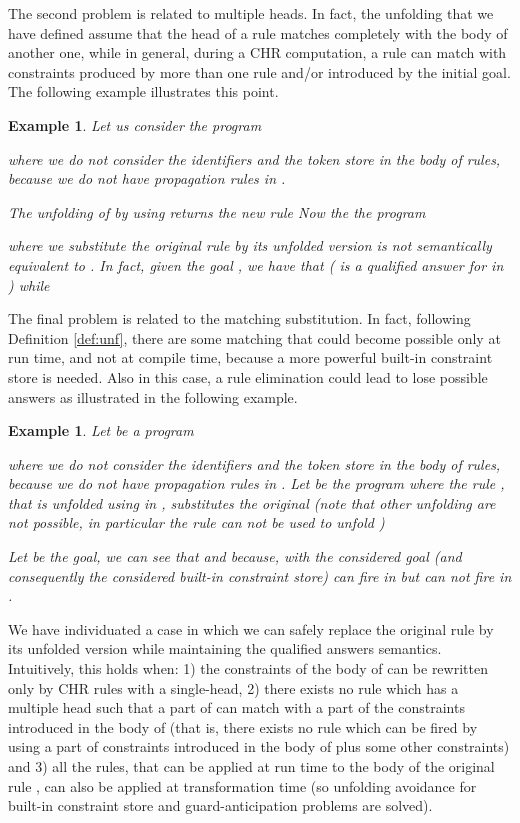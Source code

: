 \documentclass[final]{acmtrans2e}
\newtheorem{exa}[theorem]{Example}
\newenvironment{example}{\begin{exa}}{\end{exa}}
\begin{document}
The second problem is related to multiple heads. In fact, the
unfolding that we have defined  assume that the head of a rule
matches completely with the body of another one, while in general,
during a CHR computation, a rule can match with constraints
produced by more than one rule and/or  introduced by the initial
goal. The following example illustrates this point.

\begin{example}\label{ex:unicatesta}
Let us consider the program

where we do not consider the identifiers and the token store in
the body of rules, because we do not have propagation rules in
.

The unfolding  of  by using   returns the new
rule
 Now the
the program

where we substitute the original rule by its  unfolded version is
not semantically equivalent to . In fact, given the goal , we have that  
( is a qualified answer for  in ) while 
\end{example}

The final problem is related to the matching substitution. In fact,
following Definition \ref{def:unf}, there are some matching that could become
possible only at run time, and not at compile time, because a more powerful
built-in constraint store is needed. Also in this case, a rule elimination could lead to lose
possible answers as illustrated in the following example.

\begin{example}\label{ex:matching}
Let  be a program

where we do not consider the identifiers and the token store in the
body of rules, because we do not have propagation rules in .
Let  be the program where the rule , that is unfolded using  in ,
substitutes the original  (note that other unfolding are not possible, in
particular the rule  can not be used to unfold )

Let be  the goal, we can see that
 and   because,
with the considered goal (and consequently
the considered built-in constraint store)  can fire in  but can not fire in
.
\end{example}

We have individuated a case in which we can safely replace the
original rule  by its unfolded version while maintaining the
qualified answers semantics. Intuitively, this holds when: 1)  the
constraints of the body of   can
 be rewritten only by CHR rules with a single-head, 2) there exists
no rule  which has a multiple head  such that a part of 
can match with a part of the constraints introduced in the body of
 (that is, there exists no rule  which can be fired by using
a part of constraints introduced in the body of  plus some
other constraints) and 3) all the rules, that can be applied at run
time to the body of the original rule , can also be applied at
transformation time (so unfolding avoidance for built-in constraint
store and guard-anticipation problems are solved).
\end{document}
